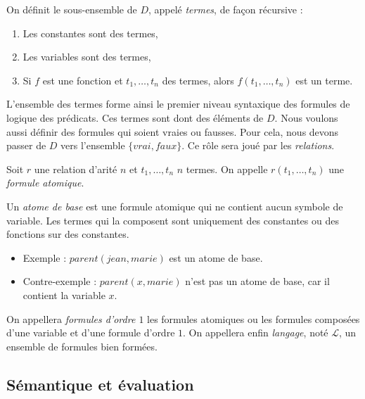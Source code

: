 \begin{definition}[Termes]
    On définit le sous-ensemble de $D$, appelé \emph{termes}, de façon récursive : 
    \begin{enumerate}[label=\roman*)]
        \item Les constantes sont des termes, 
        \item Les variables sont des termes, 
        \item Si $f$ est une fonction et $t_1, \dots, t_n$ des termes, alors $f(t_1, \dots, t_n)$ est un terme. 
    \end{enumerate}
\end{definition}

L'ensemble des termes forme ainsi le premier niveau syntaxique des formules de logique 
des prédicats. 
Ces termes sont dont des éléments de $D$. Nous voulons aussi définir des formules qui soient 
vraies ou fausses. Pour cela, nous devons passer de $D$ vers l'ensemble $ \{vrai, faux\}$. Ce rôle
sera joué par les \emph{relations}. 

\begin{definition}
    Soit $r$ une relation d'arité $n$ et $t_1, \dots, t_n$ $n$ termes. 
    On appelle $r(t_1, \dots, t_n)$ une \emph{formule atomique}. 
\end{definition}

\begin{definition}
    Un \emph{atome de base} est une formule atomique qui ne contient aucun symbole de variable. Les termes qui la composent 
    sont uniquement des constantes ou des fonctions sur des constantes.
    \begin{itemize}
        \item Exemple : $parent(jean, marie)$ est un atome de base.
        \item Contre-exemple : $parent(x, marie)$ n'est pas un atome de base, car il contient la variable $x$.
    \end{itemize}
\end{definition}

On appellera \emph{formules d'ordre $1$} les formules atomiques ou les formules 
composées d'une variable et d'une formule d'ordre $1$. On appellera enfin \emph{langage}, noté 
$ \mathcal{L}$, un ensemble de formules bien formées. 

\subsection{Sémantique et évaluation}

